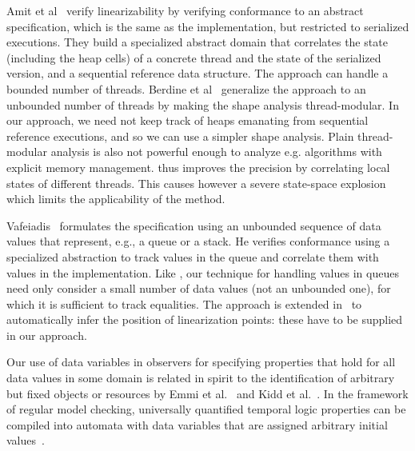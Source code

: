 Amit et al~\cite{Amit:comparisonAbstraction} verify linearizability
by verifying conformance to an abstract specification, which is
the same as the implementation, but restricted to serialized executions.
They build a specialized abstract domain that correlates the state (including
the heap cells) of a concrete thread and the state of the serialized version, and a sequential reference data structure.
The approach can handle a bounded number of threads.
Berdine et al~\cite{BLMRS:cav08} generalize
the approach to an unbounded number of threads by making the shape analysis
thread-modular.
In our approach, we need not keep track of heaps emanating from
sequential reference executions, and so we can use a simpler shape
analysis.
Plain thread-modular analysis is also not powerful enough
to analyze e.g. algorithms with explicit memory management.
%
\cite{BLMRS:cav08} thus improves the precision by correlating local states of
different threads. This causes however a severe state-space explosion
which limits the applicability of the method.


Vafeiadis~\cite{Vafeiadis:vmcai09} formulates the specification using
an unbounded sequence of data values that represent, e.g., a queue or
a stack. He verifies conformance using a specialized abstraction to
track values in the queue and correlate them with values in the implementation.
Like \cite{Shacham:thesis}, 
our technique for handling values in queues need only consider a
small number of data values (not an unbounded one), for which it is
sufficient to track equalities.
The approach is extended in~\cite{Vafeiadis:cav10} to automatically infer
the position of linearization points: these have to be supplied in our approach.

Our use of data variables in observers for specifying properties that
hold for all data values in some domain is related in spirit to the 
identification of arbitrary but fixed objects or resources
by Emmi et al.~\cite{EJKM:reference} and Kidd et
al.~\cite{KRDV:vmcai09:journal}.
In the  framework of regular model checking,
universally quantified temporal logic properties
can be compiled into automata with
data variables that are assigned arbitrary initial
values~\cite{AJNOS:logic:journal}.
%

